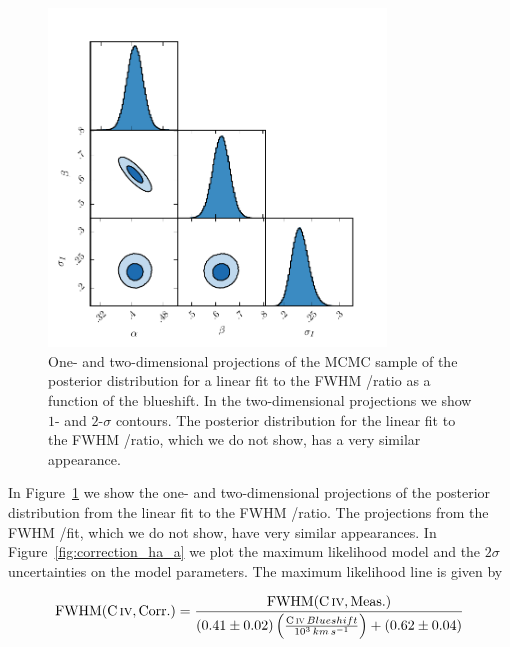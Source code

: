 \begin{figure}[h!]
    \centering
    \includegraphics[width=0.8\textwidth]{figures/chapter03/civ_ha_mcmc_parameters.pdf} 
    \caption[{One- and two-dimensional projections of the MCMC sample of the posterior distribution for a linear fit to the FWHM /\ha ratio as a function of the  blueshift.}]{One- and two-dimensional projections of the MCMC sample of the posterior distribution for a linear fit to the FWHM /\ha ratio as a function of the  blueshift. In the two-dimensional projections we show $1$- and $2$-$\sigma$ contours. The posterior distribution for the linear fit to the FWHM /\hb ratio, which we do not show, has a very similar appearance.} 
    \label{fig:mcmc_parameters}
\end{figure}

In Figure~\ref{fig:mcmc_parameters} we show the one- and two-dimensional projections of the posterior distribution from the linear fit to the FWHM /\ha ratio. 
The projections from the FWHM /\hb fit, which we do not show, have very similar appearances.
In Figure~\ref{fig:correction_ha_a} we plot the maximum likelihood model and the $2\sigma$ uncertainties on the model parameters. 
The maximum likelihood line is given by  

\begin{eqnarray}
    \label{eq:hafwhm}
    \mathrm{FWHM}(\mathrm{C}\,\textsc{iv}, \mathrm{Corr.}) = \frac{\mathrm{FWHM}(\mathrm{C}\,\textsc{iv}, \mathrm{Meas.})}{ (0.41\pm0.02) \left(\frac{\mathrm{C}\,\textsc{iv}\, Blueshift}{10^3 {\mathrm \,km\,s^{-1}}} \right) + (0.62\pm0.04)}
\end{eqnarray}

